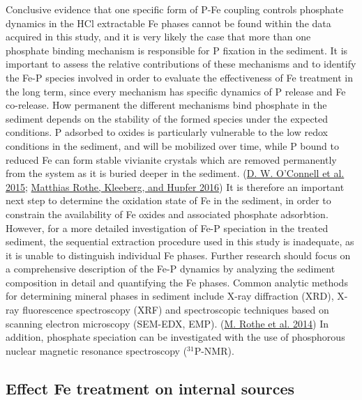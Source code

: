 \documentclass[a4paper,11pt]{article}
\begin{document}
Conclusive evidence that one specific form of P-Fe coupling controls phosphate dynamics in the HCl extractable Fe phases cannot be found within the data acquired in this study, and it is very likely the case that more than one phosphate binding mechanism is responsible for P fixation in the sediment. It is important to assess the relative contributions of these mechanisms and to identify the Fe-P species involved in order to evaluate the effectiveness of Fe treatment in the long term, since every mechanism has specific dynamics of P release and Fe co-release. How permanent the different mechanisms bind phosphate in the sediment depends on the stability of the formed species under the expected conditions. P adsorbed to oxides is particularly vulnerable to the low redox conditions in the sediment, and will be mobilized over time, while P bound to reduced Fe can form stable vivianite crystals which are removed permanently from the system as it is buried deeper in the sediment. (\protect\hyperlink{ref-oconnellVivianiteFormationIts2015}{D. W. O'Connell et al. 2015}; \protect\hyperlink{ref-rotheOccurrenceIdentificationEnvironmental2016}{Matthias Rothe, Kleeberg, and Hupfer 2016}) It is therefore an important next step to determine the oxidation state of Fe in the sediment, in order to constrain the availability of Fe oxides and associated phosphate adsorbtion. However, for a more detailed investigation of Fe-P speciation in the treated sediment, the sequential extraction procedure used in this study is inadequate, as it is unable to distinguish individual Fe phases. Further research should focus on a comprehensive description of the Fe-P dynamics by analyzing the sediment composition in detail and quantifying the Fe phases. Common analytic methods for determining mineral phases in sediment include X-ray diffraction (XRD), X-ray fluorescence spectroscopy (XRF) and spectroscopic techniques based on scanning electron microscopy (SEM-EDX, EMP). (\protect\hyperlink{ref-rotheEvidenceVivianiteFormation2014}{M. Rothe et al. 2014}) In addition, phosphate speciation can be investigated with the use of phosphorous nuclear magnetic resonance spectroscopy (\(^{31}\)P-NMR).

\hypertarget{effect-fe-treatment-on-internal-sources}{%
\subsection{Effect Fe treatment on internal sources}\label{effect-fe-treatment-on-internal-sources}}
\end{document}
